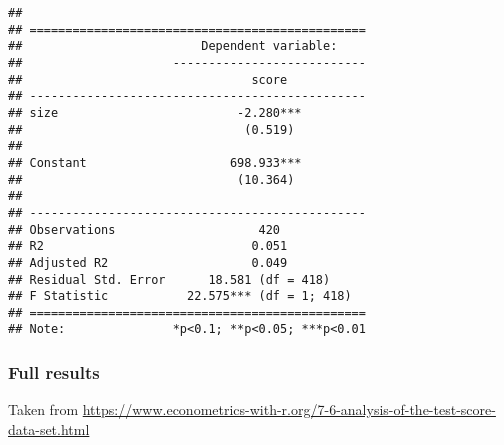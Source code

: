 \documentclass[]{book}
\begin{document}
\begin{verbatim}
## 
## ===============================================
##                         Dependent variable:    
##                     ---------------------------
##                                score           
## -----------------------------------------------
## size                         -2.280***         
##                               (0.519)          
##                                                
## Constant                    698.933***         
##                              (10.364)          
##                                                
## -----------------------------------------------
## Observations                    420            
## R2                             0.051           
## Adjusted R2                    0.049           
## Residual Std. Error      18.581 (df = 418)     
## F Statistic           22.575*** (df = 1; 418)  
## ===============================================
## Note:               *p<0.1; **p<0.05; ***p<0.01
\end{verbatim}

\hypertarget{full-results}{%
\subsubsection{Full results}\label{full-results}}

Taken from \url{https://www.econometrics-with-r.org/7-6-analysis-of-the-test-score-data-set.html}
\end{document}
